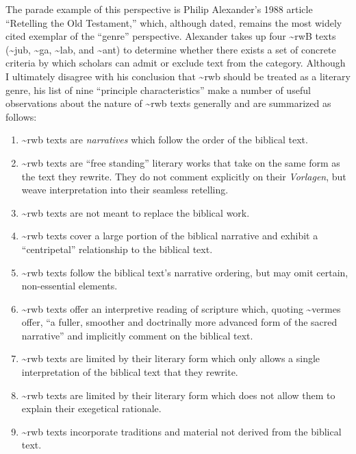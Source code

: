 The parade example of this perspective is Philip Alexander's 1988
article ``Retelling the Old Testament,'' which, although dated, remains
the most widely cited exemplar of the ``genre''
perspective.\autocites{alexander_carson-williamson1988}[\textasciitilde{}vermes
himself even put his stamp of approval on it,
see][4]{vermes_zsengeller2014} Alexander takes up four
\textasciitilde{}rwB texts (\textasciitilde{}jub, \textasciitilde{}ga,
\textasciitilde{}lab, and \textasciitilde{}ant) to determine whether
there exists a set of concrete criteria by which scholars can admit or
exclude text from the category. Although I ultimately disagree with his
conclusion that \textasciitilde{}rwb should be treated as a literary
genre, his list of nine ``principle characteristics'' make a number of
useful observations about the nature of \textasciitilde{}rwb texts
generally and are summarized as follows:

\begin{enumerate}
\def\labelenumi{\arabic{enumi}.}
\tightlist
\item
  \textasciitilde{}rwb texts are \emph{narratives} which follow the
  order of the biblical text.
\item
  \textasciitilde{}rwb texts are ``free standing'' literary works that
  take on the same form as the text they rewrite. They do not comment
  explicitly on their \emph{Vorlagen}, but weave interpretation into
  their seamless retelling.
\item
  \textasciitilde{}rwb texts are not meant to replace the biblical work.
\item
  \textasciitilde{}rwb texts cover a large portion of the biblical
  narrative and exhibit a ``centripetal'' relationship to the biblical
  text.
\item
  \textasciitilde{}rwb texts follow the biblical text's narrative
  ordering, but may omit certain, non-essential elements.
\item
  \textasciitilde{}rwb texts offer an interpretive reading of scripture
  which, quoting \textasciitilde{}vermes offer, ``a fuller, smoother and
  doctrinally more advanced form of the sacred
  narrative''\autocite[Citing \textasciitilde{}vermes
  in][305]{schurer1986} and implicitly comment on the biblical text.
\item
  \textasciitilde{}rwb texts are limited by their literary form which
  only allows a single interpretation of the biblical text that they
  rewrite.
\item
  \textasciitilde{}rwb texts are limited by their literary form which
  does not allow them to explain their exegetical rationale.
\item
  \textasciitilde{}rwb texts incorporate traditions and material not
  derived from the biblical text.
\end{enumerate}

